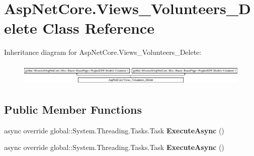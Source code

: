 \hypertarget{class_asp_net_core_1_1_views___volunteers___delete}{}\section{Asp\+Net\+Core.\+Views\+\_\+\+Volunteers\+\_\+\+Delete Class Reference}
\label{class_asp_net_core_1_1_views___volunteers___delete}
Inheritance diagram for Asp\+Net\+Core.\+Views\+\_\+\+Volunteers\+\_\+\+Delete\+:\begin{figure}[H]
\begin{center}
\leavevmode
\includegraphics[height=1.087379cm]{class_asp_net_core_1_1_views___volunteers___delete}
\end{center}
\end{figure}
\subsection*{Public Member Functions}
\begin{DoxyCompactItemize}
\item 
\mbox{\label{class_asp_net_core_1_1_views___volunteers___delete_a2b54b1e479382ae481cd583b3f06fa05}} 
async override global\+::\+System.\+Threading.\+Tasks.\+Task {\bfseries Execute\+Async} ()
\item 
\mbox{\label{class_asp_net_core_1_1_views___volunteers___delete_a2b54b1e479382ae481cd583b3f06fa05}} 
async override global\+::\+System.\+Threading.\+Tasks.\+Task {\bfseries Execute\+Async} ()
\end{DoxyCompactItemize}
